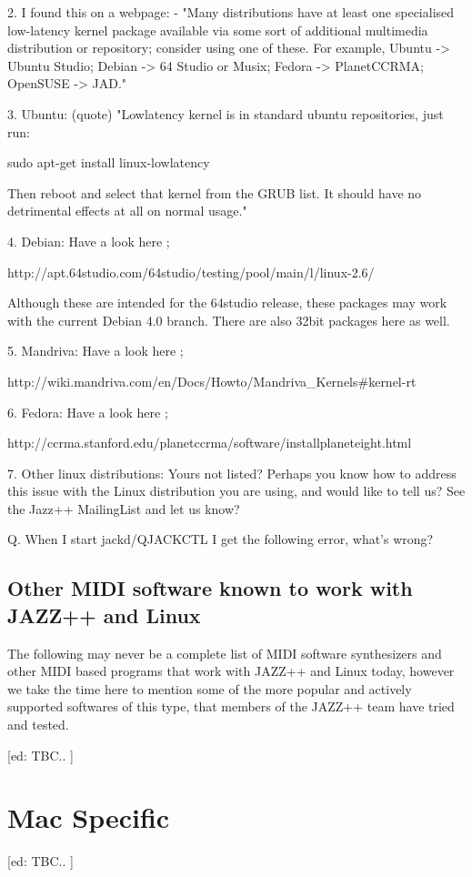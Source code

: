 \documentclass[letterpaper]{report}
\begin{document}
    2. I found this on a webpage: - "Many distributions have at least one 
    specialised low-latency kernel package available via some sort of 
    additional multimedia distribution or repository; consider using one of 
    these. For example, Ubuntu -> Ubuntu Studio; Debian  -> 64 Studio or Musix;
    Fedora  -> PlanetCCRMA; OpenSUSE -> JAD."

    3. Ubuntu: (quote) "Lowlatency kernel is in standard ubuntu repositories,
    just run: 

    sudo apt-get install linux-lowlatency

    Then reboot and select that kernel from the GRUB list. It should have no 
    detrimental effects at all on normal usage."

    4. Debian: Have a look here ;

    http://apt.64studio.com/64studio/testing/pool/main/l/linux-2.6/

    Although these are intended for the 64studio release, these packages
    may work with the current Debian 4.0 branch. There are also 32bit
    packages here as well.

    5. Mandriva: Have a look here ;

    http://wiki.mandriva.com/en/Docs/Howto/Mandriva\_Kernels\#kernel-rt

    6. Fedora: Have a look here ;

    http://ccrma.stanford.edu/planetccrma/software/installplaneteight.html

    7. Other linux distributions: Yours not listed? Perhaps you know how
    to address this issue with the Linux distribution you are using, and
    would like to tell us? See the Jazz++ MailingList and let us know?

Q. When I start jackd/QJACKCTL I get the following error, what's wrong?


\subsection{Other MIDI software known to work with JAZZ++ and Linux}

The following may never be a complete list of MIDI software synthesizers and
other MIDI based programs that work with JAZZ++ and Linux today, however we take
the time here to mention some of the more popular and actively supported
softwares of this type, that members of the JAZZ++ team have tried and tested.

[ed: TBC.. ]


\section{Mac Specific}

[ed: TBC.. ]
\end{document}
